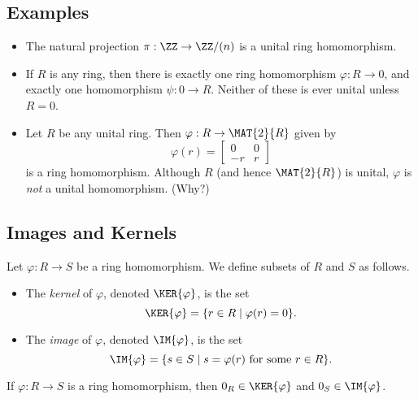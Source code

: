 \documentclass{article}
\begin{document}
\subsection*{Examples}

\begin{itemize}
\item The natural projection $\pi : \ZZ \rightarrow \ZZ/(n)$ is a unital ring homomorphism.

\item If $R$ is any ring, then there is exactly one ring homomorphism $\varphi : R \rightarrow 0$, and exactly one homomorphism $\psi : 0 \rightarrow R$. Neither of these is ever unital unless $R = 0$.

\item Let $R$ be any unital ring. Then $\varphi : R \rightarrow \MAT{2}{R}$ given by \[ \varphi(r) = \begin{bmatrix} 0 & 0 \\ -r & r \end{bmatrix} \] is a ring homomorphism. Although $R$ (and hence $\MAT{2}{R}$) is unital, $\varphi$ is \emph{not} a unital homomorphism. (Why?)
\end{itemize}



\subsection*{Images and Kernels}

\begin{dfn}
Let $\varphi : R \rightarrow S$ be a ring homomorphism. We define subsets of $R$ and $S$ as follows.
\begin{itemize}
\item The \emph{kernel} of $\varphi$, denoted $\KER{\varphi}$, is the set \[ \KER{\varphi} = \{ r \in R \mid \varphi(r) = 0 \}. \]
\item The \emph{image} of $\varphi$, denoted $\IM{\varphi}$, is the set \[ \IM{\varphi} = \{ s \in S \mid s = \varphi(r)\ \mathrm{for\ some}\ r \in R \}. \]
\end{itemize}
\end{dfn}

\begin{prop}
If $\varphi : R \rightarrow S$ is a ring homomorphism, then $0_R \in \KER{\varphi}$ and $0_S \in \IM{\varphi}$.
\end{prop}
\end{document}
